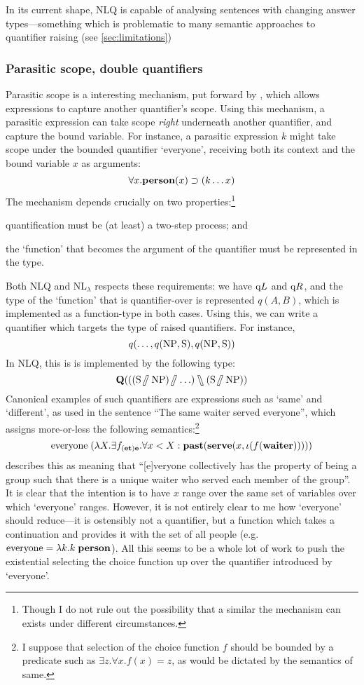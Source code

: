 In its current shape, NLQ is capable of analysing sentences with
changing answer types---something which is problematic to many
semantic approaches to quantifier raising (see \autoref{sec:limitations})





\subsubsection{Parasitic scope, double quantifiers}
\label{sec:parasitic-scope}
Parasitic scope is a interesting mechanism, put forward by
\citet{barker2007}, which allows expressions to capture another
quantifier's scope. Using this mechanism, a parasitic expression can
take scope \emph{right} underneath another quantifier, and capture the
bound variable. For instance, a parasitic expression $k$ might take
scope under the bounded quantifier `everyone', receiving both its
context and the bound variable $x$ as arguments:
\[
  \forall{x}.\PERSON(x)\supset(k\ldots{x})
\]
The mechanism depends crucially on two properties:\footnote{%
  Though I do not rule out the possibility that a similar the
  mechanism can exists under different circumstances.
}
\begin{enumerate*}[label=(\arabic*)]
\item quantification must be (at least) a two-step process; and
\item the `function' that becomes the argument of the quantifier must
  be represented in the type.
\end{enumerate*}
Both NLQ and NL$_\lambda$ respects these requirements: we have $\qup$
and $\qdown$, and the type of the `function' that is quantifier-over
is represented $q(A,B)$, which is implemented as a function-type in
both cases. Using this, we can write a quantifier which targets the
type of raised quantifiers. For instance,
\[
  q(\ldots,q(\NP,\S),q(\NP,\S))
\]
In NLQ, this is is implemented by the following type:
\[
  \q[((\S\himpl\NP)\himpl\ldots)\himpr(\S\himpl\NP)]
\]
Canonical examples of such quantifiers are expressions such as `same'
and `different', as used in the sentence ``The same waiter served
everyone'', which \citet{barker2007} assigns more-or-less the
following semantics:\footnote{%
  I suppose that selection of the choice function $f$ should be
  bounded by a predicate such as $\exists{z}.\forall{x}.f(x)=z$, as
  would be dictated by the semantics of same.
}
\[
  \text{everyone}\;(\lambda{X}.\exists{f_{(\e\t)\e}}.\forall{x<X}:
  \PAST(\SERVE(x,\iota(f(\WAITER)))))
\]
\citeauthor{barker2007} describes this as meaning that ``[e]veryone
collectively has the property of being a group such that there is a
unique waiter who served each member of the group''. It is clear that
the intention is to have $x$ range over the same set of variables over
which `everyone' ranges. However, it is not entirely clear to me how
`everyone' should reduce---it is ostensibly not a quantifier, but a
function which takes a continuation and provides it with the set of
all people (e.g.\ $\text{everyone}=\lambda{k}.k\;\PERSON$). All this
seems to be a whole lot of work to push the existential selecting the
choice function up over the quantifier introduced by `everyone'.

